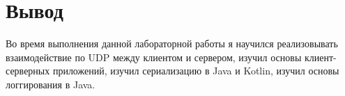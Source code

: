 \section{Вывод}
Во время выполнения данной лабораторной работы я научился
реализовывать взаимодействие по UDP между клиентом и сервером,
изучил основы клиент-серверных приложений, изучил сериализацию в Java и Kotlin,
изучил основы логгирования в Java.

